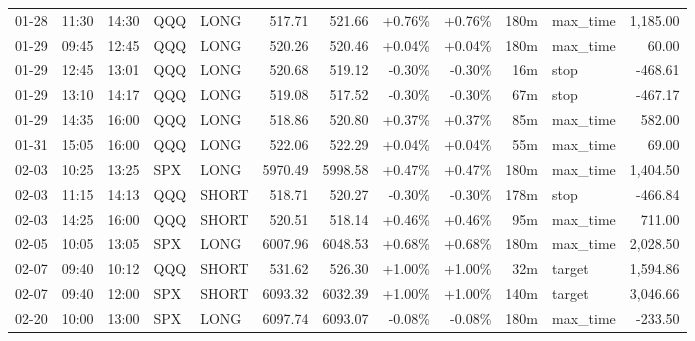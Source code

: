 \documentclass[11pt,a4paper]{article}
\begin{document}
\begin{center}
\begin{longtable}{>{\color{txtmain}}l l l l l r r r r r >{\color{txtmain}}l r}
01-28 & 11:30 & 14:30 & QQQ & LONG & 517.71 & 521.66 & \textcolor{wingreen}{+0.76\%} & \textcolor{wingreen}{+0.76\%} & 180m & max\_time & \textcolor{wingreen}{1,185.00} \\
01-29 & 09:45 & 12:45 & QQQ & LONG & 520.26 & 520.46 & \textcolor{wingreen}{+0.04\%} & \textcolor{wingreen}{+0.04\%} & 180m & max\_time & \textcolor{wingreen}{60.00} \\
01-29 & 12:45 & 13:01 & QQQ & LONG & 520.68 & 519.12 & \textcolor{lossred}{-0.30\%} & \textcolor{lossred}{-0.30\%} & 16m & stop & \textcolor{lossred}{-468.61} \\
01-29 & 13:10 & 14:17 & QQQ & LONG & 519.08 & 517.52 & \textcolor{lossred}{-0.30\%} & \textcolor{lossred}{-0.30\%} & 67m & stop & \textcolor{lossred}{-467.17} \\
01-29 & 14:35 & 16:00 & QQQ & LONG & 518.86 & 520.80 & \textcolor{wingreen}{+0.37\%} & \textcolor{wingreen}{+0.37\%} & 85m & max\_time & \textcolor{wingreen}{582.00} \\
01-31 & 15:05 & 16:00 & QQQ & LONG & 522.06 & 522.29 & \textcolor{wingreen}{+0.04\%} & \textcolor{wingreen}{+0.04\%} & 55m & max\_time & \textcolor{wingreen}{69.00} \\
02-03 & 10:25 & 13:25 & SPX & LONG & 5970.49 & 5998.58 & \textcolor{wingreen}{+0.47\%} & \textcolor{wingreen}{+0.47\%} & 180m & max\_time & \textcolor{wingreen}{1,404.50} \\
02-03 & 11:15 & 14:13 & QQQ & SHORT & 518.71 & 520.27 & \textcolor{lossred}{-0.30\%} & \textcolor{lossred}{-0.30\%} & 178m & stop & \textcolor{lossred}{-466.84} \\
02-03 & 14:25 & 16:00 & QQQ & SHORT & 520.51 & 518.14 & \textcolor{wingreen}{+0.46\%} & \textcolor{wingreen}{+0.46\%} & 95m & max\_time & \textcolor{wingreen}{711.00} \\
02-05 & 10:05 & 13:05 & SPX & LONG & 6007.96 & 6048.53 & \textcolor{wingreen}{+0.68\%} & \textcolor{wingreen}{+0.68\%} & 180m & max\_time & \textcolor{wingreen}{2,028.50} \\
02-07 & 09:40 & 10:12 & QQQ & SHORT & 531.62 & 526.30 & \textcolor{wingreen}{+1.00\%} & \textcolor{wingreen}{+1.00\%} & 32m & target & \textcolor{wingreen}{1,594.86} \\
02-07 & 09:40 & 12:00 & SPX & SHORT & 6093.32 & 6032.39 & \textcolor{wingreen}{+1.00\%} & \textcolor{wingreen}{+1.00\%} & 140m & target & \textcolor{wingreen}{3,046.66} \\
02-20 & 10:00 & 13:00 & SPX & LONG & 6097.74 & 6093.07 & \textcolor{lossred}{-0.08\%} & \textcolor{lossred}{-0.08\%} & 180m & max\_time & \textcolor{lossred}{-233.50} \\

\end{longtable}
\end{center}
\end{document}
